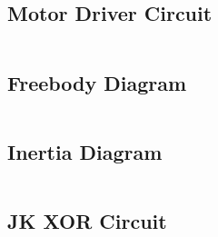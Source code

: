 \subsection{Motor Driver Circuit}
\begin{verbatim}
\end{verbatim}

\subsection{Freebody Diagram}
\begin{verbatim}
\end{verbatim}

\subsection{Inertia Diagram}
\begin{verbatim}
\end{verbatim}

\subsection{JK XOR Circuit}
\begin{verbatim}
\end{verbatim}

